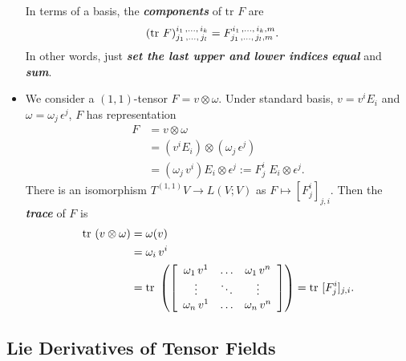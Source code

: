 \documentclass[11pt]{article}
\begin{document}
\begin{itemize}
\begin{definition}
In terms of a basis, the \emph{\textbf{components}} of $\text{tr }F$ are
\begin{align*}
(\text{tr }F)_{j_1 \,{,}\ldots{,}\, j_l}^{i_1 \,{,}\ldots{,}\, i_k} &= F_{j_1 \,{,}\ldots{,}\, j_l, m}^{i_1 \,{,}\ldots{,}\, i_k, m}.
\end{align*} In other words, just \emph{\textbf{set the last upper and lower indices} \textbf{equal}} and \textbf{\emph{sum}}.
\end{definition}

\item \begin{remark}
We consider a $(1,1)$-tensor $F = v \otimes \omega$. Under standard basis, $v = v^i E_i$ and $\omega = \omega_j\, \epsilon^j$, $F$ has representation
\begin{align*}
 F  &= v \otimes \omega \\
 &= (v^i E_i) \otimes  (\omega_j\, \epsilon^j) \\
 &= (\omega_j\,v^i) E_i \otimes \epsilon^j := F_{j}^{i} \;E_i \otimes \epsilon^j.
\end{align*} There is an isomorphism $T^{(1,1)}V \rightarrow L(V;V)$ as $F \mapsto [F_{j}^{i}]_{j,i}$.
Then the \emph{\textbf{trace}} of $F$ is 
\begin{align*}
\text{tr }(v \otimes \omega) &= \omega(v) \\
&= \omega_i \, v^i\\
&= \text{tr }\left(\left[\begin{array}{ccc}
\omega_1 \, v^1 & \ldots & \omega_1 \, v^n\\
\vdots & \ddots & \vdots \\
\omega_n \, v^1 & \ldots & \omega_n \, v^n
\end{array}
\right]\right) = \text{tr }[F_{j}^{i}]_{j,i}.
\end{align*}
\end{remark}
\end{itemize}

\subsection{Lie Derivatives of Tensor Fields}



\newpage


\end{document}
